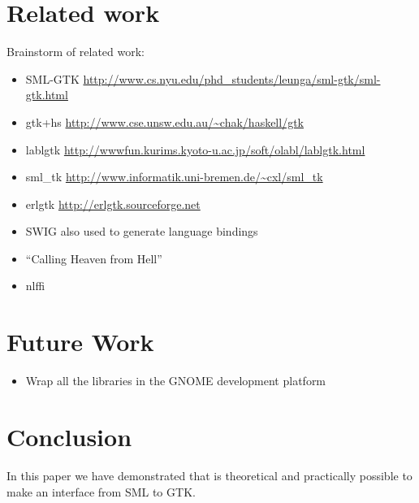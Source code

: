 \documentclass[workingdraft,endnotes]{usetex-v1}
\begin{document}
\section{Related work}
\label{sec:related-work}

 Brainstorm of related work:
\begin{itemize}
\item SML-GTK 
\url{http://www.cs.nyu.edu/phd_students/leunga/sml-gtk/sml-gtk.html}

\item gtk+hs
\url{http://www.cse.unsw.edu.au/~chak/haskell/gtk}

\item lablgtk
\url{http://wwwfun.kurims.kyoto-u.ac.jp/soft/olabl/lablgtk.html}

\item sml\_tk
\url{http://www.informatik.uni-bremen.de/~cxl/sml_tk}

\item erlgtk
\url{http://erlgtk.sourceforge.net}


\item SWIG also used to generate language bindings

\item ``Calling Heaven from Hell''

\item nlffi

\end{itemize}



\section{Future Work}
\label{sec:future-work}

\begin{itemize}
\item Wrap all the libraries in the GNOME development platform
\end{itemize}



\section{Conclusion}
\label{sec:conclusion}

In this paper we have demonstrated that is theoretical and practically
possible to make an interface from SML to GTK.



\end{document}
